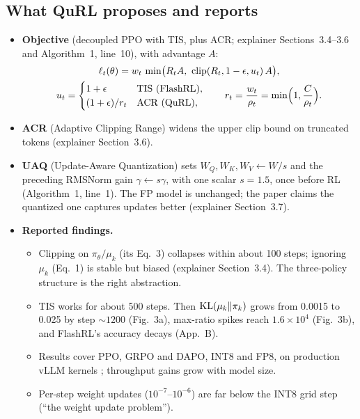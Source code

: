 \documentclass[11pt]{article}
\begin{document}
\subsection{What QuRL proposes and reports}
\begin{itemize}
\item \textbf{Objective} (decoupled PPO with TIS, plus ACR; explainer Sections~3.4--3.6 and Algorithm~1, line~10), with advantage $A$:
\begin{gather*}
\ell_t(\theta)=w_t\,\min\bigl(R_tA,\ \clip(R_t,1-\epsilon,u_t)\,A\bigr),\\
u_t=\begin{cases}1+\epsilon & \text{TIS (FlashRL)},\\ (1+\epsilon)/r_t & \text{ACR (QuRL)},\end{cases}\qquad
r_t=\frac{w_t}{\rho_t}=\min\Bigl(1,\frac{C}{\rho_t}\Bigr).
\end{gather*}
\item \textbf{ACR} (Adaptive Clipping Range) widens the upper clip bound on truncated tokens (explainer Section~3.6).
\item \textbf{UAQ} (Update-Aware Quantization) sets $W_Q,W_K,W_V\leftarrow W/s$ and the preceding RMSNorm gain $\gamma\leftarrow s\gamma$, with one scalar $s=1.5$, once before RL (Algorithm~1, line~1). The FP model is unchanged; the paper claims the quantized one captures updates better (explainer Section~3.7).
\item \textbf{Reported findings.}
  \begin{itemize}
  \item Clipping on $\pi_\theta/\mu_k$ (its Eq.~3) collapses within about 100 steps; ignoring $\mu_k$ (Eq.~1) is stable but biased (explainer Section~3.4). The three-policy structure is the right abstraction.
  \item TIS works for about 500 steps. Then $\mathrm{KL}(\mu_k\|\pi_k)$ grows from 0.0015 to 0.025 by step ${\sim}1200$ (Fig.~3a), max-ratio spikes reach $1.6\times10^4$ (Fig.~3b), and FlashRL's accuracy decays (App.~B).
  \item Results cover PPO, GRPO and DAPO, INT8 and FP8, on production vLLM kernels \citep{kwon2023vllm}; throughput gains grow with model size.
  \item Per-step weight updates ($10^{-7}$--$10^{-6}$) are far below the INT8 grid step (``the weight update problem'').
  \end{itemize}
\end{itemize}
\end{document}
